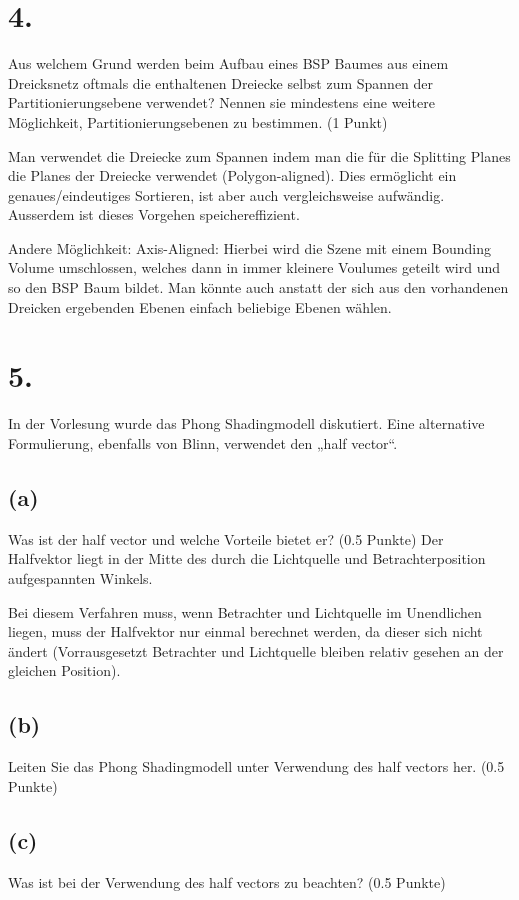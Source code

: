 \documentclass[12pt]{scrreprt}
\begin{document}
\section*{4.}
Aus welchem Grund werden beim Aufbau eines BSP Baumes aus einem Dreicksnetz oftmals die enthaltenen Dreiecke selbst zum Spannen der Partitionierungsebene verwendet? Nennen sie mindestens eine weitere Möglichkeit, Partitionierungsebenen zu bestimmen. (1 Punkt)

Man verwendet die Dreiecke zum Spannen indem man die für die Splitting Planes die Planes der Dreiecke verwendet (Polygon-aligned). Dies ermöglicht ein genaues/eindeutiges Sortieren, ist aber auch vergleichsweise aufwändig.
Ausserdem ist dieses Vorgehen speichereffizient.

Andere Möglichkeit: Axis-Aligned: Hierbei wird die Szene mit einem Bounding Volume umschlossen, welches dann in immer kleinere Voulumes geteilt wird und so den BSP Baum bildet.
Man könnte auch anstatt der sich aus den vorhandenen Dreicken ergebenden Ebenen einfach beliebige Ebenen wählen.


\section*{5.}
In der Vorlesung wurde das Phong Shadingmodell diskutiert. Eine alternative Formulierung, ebenfalls von Blinn, verwendet den „half vector“.

\subsection*{(a)}
Was ist der half vector und welche Vorteile bietet er? (0.5 Punkte)
Der Halfvektor liegt in der Mitte des durch die Lichtquelle und Betrachterposition aufgespannten Winkels.

Bei diesem Verfahren muss, wenn Betrachter und Lichtquelle im Unendlichen liegen, muss der Halfvektor nur einmal berechnet werden, da dieser sich nicht ändert (Vorrausgesetzt Betrachter und Lichtquelle bleiben relativ gesehen an der gleichen Position).
\subsection*{(b)}
Leiten Sie das Phong Shadingmodell unter Verwendung des half vectors her. (0.5 Punkte)



\subsection*{(c)}
Was ist bei der Verwendung des half vectors zu beachten? (0.5 Punkte)
\end{document}
